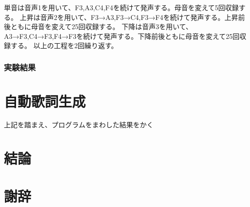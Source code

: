 \documentclass[10ptj,a4j,dvipdfmx,uplatex]{jsbook}
\begin{document}
単音は音声1を用いて、F3,A3,C4,F4を続けて発声する。母音を変えて5回収録する。
上昇は音声2を用いて、F3→A3,F3→C4,F3→F4を続けて発声する。上昇前後ともに母音を変えて25回収録する。
下降は音声3を用いて、A3→F3,C4→F3,F4→F3を続けて発声する。下降前後ともに母音を変えて25回収録する。
以上の工程を2回繰り返す。

\subsection{実験結果}


\chapter{自動歌詞生成}
上記を踏まえ、プログラムをまわした結果をかく

\chapter{結論}

\chapter{謝辞}




\end{document}

